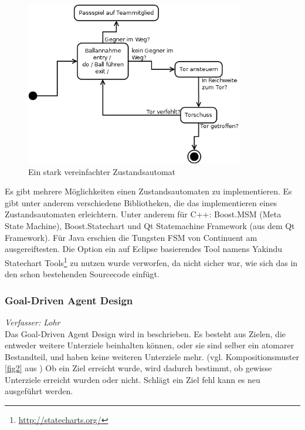\documentclass[fontsize=12pt,a4paper,final]{scrartcl}[2003/01/01]
\begin{document}
\begin{figure}[ht]
	\centering
  \includegraphics[width=0.85\textwidth]{Grafiken/KI/Bsp-Zustandsdiagramm.png}
	\caption{Ein stark vereinfachter Zustandsautomat}
	\label{fig1}
\end{figure}

Es gibt mehrere Möglichkeiten einen Zustandsautomaten zu implementieren. Es gibt unter anderem verschiedene Bibliotheken, die das implementieren eines Zustandsautomaten erleichtern. Unter anderem für C++: Boost.MSM (Meta State Machine), Boost.Statechart und Qt Statemachine Framework (aus dem Qt Framework). Für Java erschien die Tungsten FSM von Continuent am ausgereiftesten. Die Option ein auf Eclipse basierendes Tool namens Yakindu Statechart Tools\footnote{\url{http://statecharts.org/}} zu nutzen wurde verworfen, da nicht sicher war, wie sich das in den schon bestehenden Sourcecode einfügt.

\subsubsection{Goal-Driven Agent Design}
\textit{Verfasser: Lohr}\\
Das Goal-Driven Agent Design wird in \cite[S. 379 ff.]{buckland2005programming} beschrieben. Es besteht aus Zielen, die entweder weitere Unterziele beinhalten können, oder sie sind selber ein atomarer Bestandteil, und haben keine weiteren Unterziele mehr. (vgl. Kompositionsmuster \ref{fig2} aus \cite{gamma1994design}) Ob ein Ziel erreicht wurde, wird dadurch bestimmt, ob gewisse Unterziele erreicht wurden oder nicht. Schlägt ein Ziel fehl kann es neu ausgeführt werden.
\end{document}

